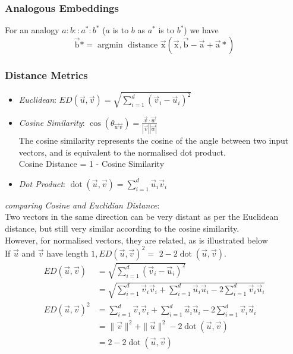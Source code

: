 \documentclass[8pt]{extarticle} %
\begin{document}
\begin{multicols*}{3}
\subsubsection*{Analogous Embeddings}
For an analogy $a:b:: a^*: b^*$ ($a$ is to $b$ as $a^*$ is to $b^*$) we have 
$$
\overrightarrow{\mathrm{b}} *=\operatorname{argmin} \text { distance } \overrightarrow{\mathrm{x}}(\overrightarrow{\mathrm{x}}, \overrightarrow{\mathrm{b}}-\overrightarrow{\mathrm{a}}+\overrightarrow{\mathrm{a}} *)
$$
\subsubsection*{Distance Metrics}
\begin{itemize}[label=\textbullet, labelsep=0.3em, leftmargin=0.5em, itemsep=0em]
    \item \textit{Euclidean}: $E D(\vec{u}, \vec{v})=\sqrt{\sum_{i=1}^d\left(\vec{v}_i-\vec{u}_i\right)^2}$
    \item \textit{Cosine Similarity}: $\cos \left(\theta_{\vec{w} \vec{v}}\right)=\frac{\vec{v} \cdot \vec{w}}{|\vec{v}||\vec{w}|}$\\
The cosine similarity represents the cosine of the angle between two input vectors, and is equivalent to the normalised dot product. \\
Cosine Distance = 1 - Cosine Similarity
    \item \textit{Dot Product}: $\operatorname{dot}(\vec{u}, \vec{v})=\sum_{i=1}^d \vec{u}_i \vec{v}_i$
\end{itemize}
\textit{comparing Cosine and Euclidian Distance}:\\
Two vectors in the same direction can be very distant as per the Euclidean distance, but still very similar according to the cosine similarity. \\
However, for normalised vectors, they are related, as is illustrated below\\
If $\vec{u}$ and $\vec{v}$ have length $1, E D(\vec{u}, \vec{v})^2=$ $2-2 \operatorname{dot}(\vec{u}, \vec{v})$.
$$
\begin{aligned}
E D(\vec{u}, \vec{v}) & =\sqrt{\sum_{i=1}^d\left(\vec{v}_i-\vec{u}_i\right)^2} \\
&=\sqrt{\sum_{i=1}^d \vec{v}_i \vec{v}_i+\sum_{i=1}^d \vec{u}_i \vec{u}_i-2 \sum_{i=1}^d \vec{v}_i \vec{u}_i} \\
E D(\vec{u}, \vec{v})^2 & =\sum_{i=1}^d \vec{v}_i \vec{v}_i+\sum_{i=1}^d \vec{u}_i \vec{u}_i-2 \sum_{i=1}^d \vec{v}_i \vec{u}_i\\
&=\|\vec{v}\|^2+\|\vec{u}\|^2-2 \operatorname{dot}(\vec{u}, \vec{v})\\
&=2-2\operatorname{dot}(\vec{u}, \vec{v})
\end{aligned}
$$


\end{multicols*}
\end{document}

